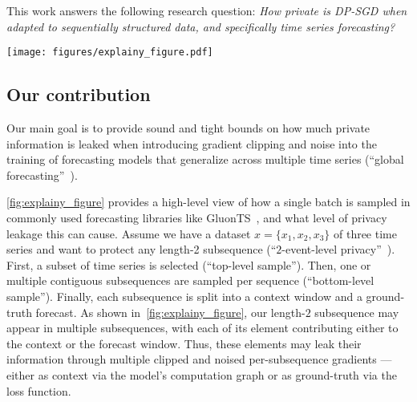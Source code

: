 This work answers the following research question: 
\textit{How private is DP-SGD when adapted to sequentially structured data, and specifically time series forecasting?}




\begin{figure*}[ht]
    \centering
    \vskip 0.2in
    \texttt{[image: figures/explainy\_figure.pdf]}
    \caption{High-level view on batching in global forecasting, which
    (1) selects one or multiple sequences (``top-level sample''),
    (2) selects one or multiple contiguous subsequences per sequence (``bottom-level sample''),
    and (3) partitions these subsequences for self-supervised training (``context--forecast split'').
    Elements of sensitive information from a short subsequence (red) may appear in the batch multiple times at different positions.}
    \label{fig:explainy_figure}
    \vskip -0.2in
\end{figure*}




\subsection{Our contribution}
Our main goal is to provide sound and tight bounds on how much private information is leaked when introducing gradient clipping and noise into the training of forecasting models that generalize across multiple time series (``global forecasting''~\cite{januschowski2020criteria}).

\cref{fig:explainy_figure} provides a high-level view of how a single batch is sampled in commonly used forecasting libraries like GluonTS~\cite{alexandrov2019gluonts}, and what level of privacy leakage this can cause. 
Assume we have a dataset $x = \{x_1,x_2,x_3\}$ of three time series and want to protect any length-2 subsequence (``$2$-event-level privacy''~\cite{kellaris2014differentially}).
First, a subset of time series is selected (``top-level sample'').
Then, one or multiple contiguous subsequences are sampled per sequence (``bottom-level sample'').
Finally, each subsequence is split into a context window and a ground-truth forecast.
As shown in~\cref{fig:explainy_figure}, our length-$2$ subsequence may appear in multiple subsequences, with each of its element contributing either to the context or the forecast window.
Thus, these elements may leak their information through multiple clipped and noised per-subsequence gradients --- either as context via the model's computation graph or as ground-truth via the loss function. 


